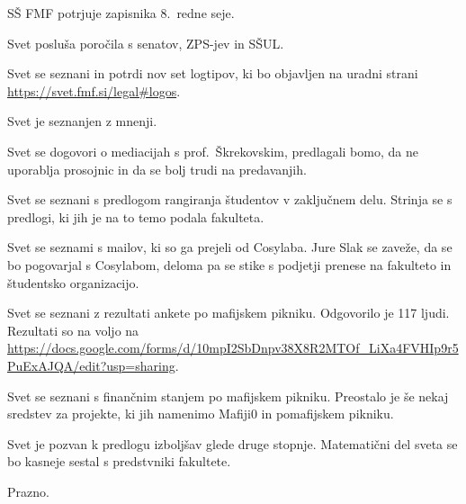 \documentclass{seja}
\begin{document}
\begin{ad}
\item
\begin{sklep*}
SŠ FMF potrjuje zapisnika 8.~redne seje.
\end{sklep*}

\item Svet posluša poročila s senatov, ZPS-jev in SŠUL.
\item Svet se seznani in potrdi nov set logtipov, ki bo
objavljen na uradni strani\\ \url{https://svet.fmf.si/legal#logos}.

\item Svet je seznanjen z mnenji.

\item Svet se dogovori o mediacijah s prof.\ Škrekovskim, predlagali bomo,
da ne uporablja prosojnic in da se bolj trudi na predavanjih.

\item Svet se seznani s predlogom rangiranja študentov v zaključnem delu.
Strinja se s predlogi, ki jih je na to temo podala fakulteta.

\item Svet se seznami s mailov, ki so ga prejeli od Cosylaba. Jure Slak se zaveže,
da se bo pogovarjal s Cosylabom, deloma pa se stike s podjetji prenese na fakulteto in študentsko organizacijo.

\item Svet se seznani z rezultati ankete po mafijskem pikniku.
Odgovorilo je 117 ljudi. Rezultati so na voljo na \\ {\scriptsize \url{https://docs.google.com/forms/d/10mpI2SbDnpv38X8R2MTOf_LiXa4FVHIp9r5PuExAJQA/edit?usp=sharing}}.

\item Svet se seznani s finančnim stanjem po mafijskem pikniku. Preostalo je še nekaj sredstev za projekte, ki jih namenimo Mafiji0 in pomafijskem pikniku.

\item Svet je pozvan k predlogu izboljšav glede druge stopnje. Matematični del sveta se
bo kasneje sestal s predstvniki fakultete.

\item Prazno.

\end{ad}

\makeatletter \global\let\@enddocumenthook\@empty \makeatother
{}
\end{document}
